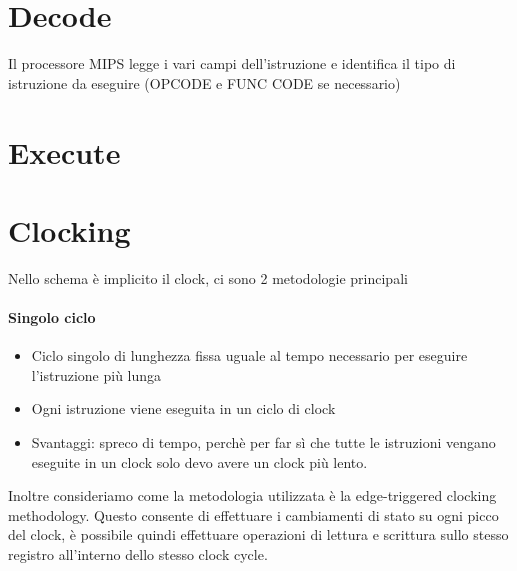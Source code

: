 \documentclass[12pt, a4paper, openany]{book}
\begin{document}
\section*{Decode}
Il processore MIPS legge i vari campi dell'istruzione e identifica il tipo di istruzione
da eseguire (OPCODE e FUNC CODE se necessario)
\section*{Execute}
\section*{Clocking}
Nello schema è implicito il clock, ci sono 2 metodologie principali
\paragraph*{Singolo ciclo} \begin{itemize}
    \item Ciclo singolo di lunghezza fissa uguale al tempo necessario per eseguire l'istruzione
    più lunga
    \item Ogni istruzione viene eseguita in un ciclo di clock
    \item Svantaggi: spreco di tempo, perchè per far sì che tutte le istruzioni vengano eseguite in 
    un clock solo devo avere un clock più lento.
\end{itemize}
Inoltre consideriamo come la metodologia utilizzata è la edge-triggered clocking methodology.
Questo consente di effettuare i cambiamenti di stato su ogni picco del clock, è possibile
quindi effettuare operazioni di lettura e scrittura sullo stesso registro all'interno dello stesso clock
cycle.
\end{document}
